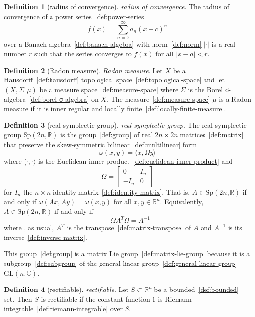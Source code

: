 \documentclass[12pt,a4paper]{article}
\theoremstyle{definition}
\newtheorem{definition}{Definition}
\begin{document}
\begin{definition}[radius of convergence]\label{def:radius-of-convergence}
\emph{radius of convergence}. The radius of convergence of a power series~\ref{def:power-series} $$f(x) = \sum_{n=0}^\infty a_n(x-c)^n$$over a Banach algebra~\ref{def:banach-algebra} with norm~\ref{def:norm} $\vert \cdot\vert $ is a real number $r$ such that the series converges to $f(x)$ for all $\vert x-a\vert <r$.
\end{definition}

\begin{definition}[Radon measure]\label{def:radon-measure}
\emph{Radon measure}. Let $X$ be a Hausdorff~\ref{def:hausdorff} topological space~\ref{def:topological-space} and let $(X, \Sigma, \mu)$ be a measure space~\ref{def:measure-space} where $\Sigma$ is the Borel σ-algebra~\ref{def:borel-σ-algebra} on $X$. The measure~\ref{def:measure-space} $\mu$ is a Radon measure if it is inner regular and locally finite~\ref{def:locally-finite-measure}.
\end{definition}

\begin{definition}[real symplectic group]\label{def:real-symplectic-group}
\emph{real symplectic group}. The real symplectic group $\text{Sp}(2n,\mathbb R)$ is the group~\ref{def:group} of real $2n\times 2n$ matrices~\ref{def:matrix} that preserve the skew-symmetric bilinear~\ref{def:multilinear} form $$\omega(x,y) = \langle x,\Omega y\rangle$$ where $\langle\cdot,\cdot\rangle$ is the Euclidean inner product~\ref{def:euclidean-inner-product} and $$\Omega = \begin{bmatrix}0 & I_n \\ -I_n & 0\end{bmatrix}$$ for $I_n$ the $n\times n$ identity matrix~\ref{def:identity-matrix}. That is, $A\in \text{Sp}(2n, \mathbb R)$ if and only if $\omega(Ax,Ay) = \omega(x,y)$ for all $x,y \in \mathbb R^n$. Equivalently,  $A\in \text{Sp}(2n, \mathbb R)$ if and only if $$-\Omega A^T \Omega = A^{-1}$$ where , as usual, $A^T$ is the transpose~\ref{def:matrix-transpose} of $A$ and $A^{-1}$ is its inverse~\ref{def:inverse-matrix}.

This group~\ref{def:group} is a matrix Lie group~\ref{def:matrix-lie-group} because it is a subgroup~\ref{def:subgroup} of the general linear group~\ref{def:general-linear-group} $\text{GL}(n,\mathbb C)$.
\end{definition}

\begin{definition}[rectifiable]\label{def:rectifiable}
\emph{rectifiable}. Let $S \subset\mathbb R^n$ be a bounded~\ref{def:bounded} set. Then $S$ is rectifiable if the constant function $1$ is Riemann integrable~\ref{def:riemann-integrable} over $S$.
\end{definition}
\end{document}
